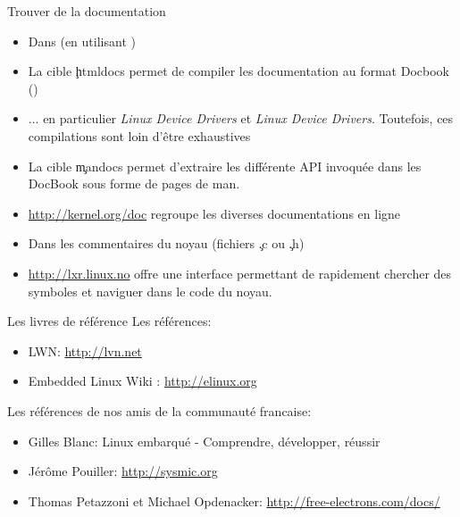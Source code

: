 \begin{frame}[fragile=singleslide]{Trouver de la documentation}
  \begin{itemize} 
  \item Dans  (en utilisant )
  \item La cible \c{htmldocs}  permet de compiler les documentation au
    format Docbook ()
  \item ... en particulier  \emph{Linux Device Drivers} et \emph{Linux
      Device  Drivers}. Toutefois, ces  compilations sont  loin d'être
    exhaustives
  \item  La cible  \c{mandocs}  permet d'extraire  les différente  API
    invoquée dans les DocBook sous forme de pages de man.
  \item    \url{http://kernel.org/doc}     regroupe    les    diverses
    documentations en ligne
  \item Dans les commentaires du noyau (fichiers \c{.c} ou \c{.h})
  \item  \url{http://lxr.linux.no} offre  une interface  permettant de
    rapidement  chercher des  symboles  et naviguer  dans  le code  du
    noyau.
  \end{itemize}
\end{frame}

\begin{frame}[fragile=singleslide]{Les livres de référence}
  Les références:
  \\
  \begin{center}
    \hspace{0.5cm}
    \hspace{0.5cm}
  \end{center}
  \begin{itemize} 
  \item LWN: \url{http://lvn.net}
  \item Embedded Linux Wiki : \url{http://elinux.org}
  \end{itemize} 
  Les références de nos amis de la communauté francaise:
  \begin{itemize} 
  \item Gilles Blanc: Linux embarqué - Comprendre, développer, réussir
  \item Jérôme Pouiller: \url{http://sysmic.org}
  \item      Thomas     Petazzoni      et      Michael     Opdenacker:
    \url{http://free-electrons.com/docs/}
  \end{itemize} 
\end{frame}

